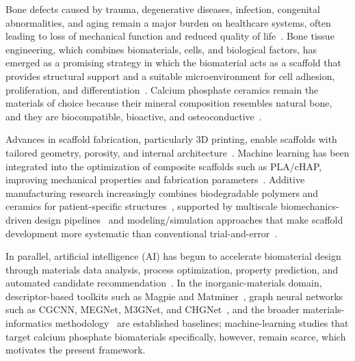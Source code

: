 \documentclass[11pt,a4paper]{article}
\begin{document}
Bone defects caused by trauma, degenerative diseases, infection, congenital abnormalities, and aging remain a major burden on healthcare systems, often leading to loss of mechanical function and reduced quality of life~\cite{farag2023}. Bone tissue engineering, which combines biomaterials, cells, and biological factors, has emerged as a promising strategy in which the biomaterial acts as a scaffold that provides structural support and a suitable microenvironment for cell adhesion, proliferation, and differentiation~\cite{farag2023}. Calcium phosphate ceramics remain the materials of choice because their mineral composition resembles natural bone, and they are biocompatible, bioactive, and osteoconductive~\cite{vaiani2023}.

Advances in scaffold fabrication, particularly 3D printing, enable scaffolds with tailored geometry, porosity, and internal architecture~\cite{premananth2024}. Machine learning has been integrated into the optimization of composite scaffolds such as PLA/cHAP, improving mechanical properties and fabrication parameters~\cite{omigbodun2024}. Additive manufacturing research increasingly combines biodegradable polymers and ceramics for patient-specific structures~\cite{zhu2025}, supported by multiscale biomechanics-driven design pipelines~\cite{hou2026} and modeling/simulation approaches that make scaffold development more systematic than conventional trial-and-error~\cite{vasudev2026}.

In parallel, artificial intelligence (AI) has begun to accelerate biomaterial design through materials data analysis, process optimization, property prediction, and automated candidate recommendation~\cite{martelli2025,logeshwaran2024,gokcekuyu2024}. In the inorganic-materials domain, descriptor-based toolkits such as Magpie and Matminer~\cite{ward2016,ward2018}, graph neural networks such as CGCNN, MEGNet, M3GNet, and CHGNet~\cite{xie2018,chen2019,chen2022,deng2023}, and the broader materials-informatics methodology~\cite{ramprasad2017,schmidt2019} are established baselines; machine-learning studies that target calcium phosphate biomaterials specifically, however, remain scarce, which motivates the present framework.
\end{document}
